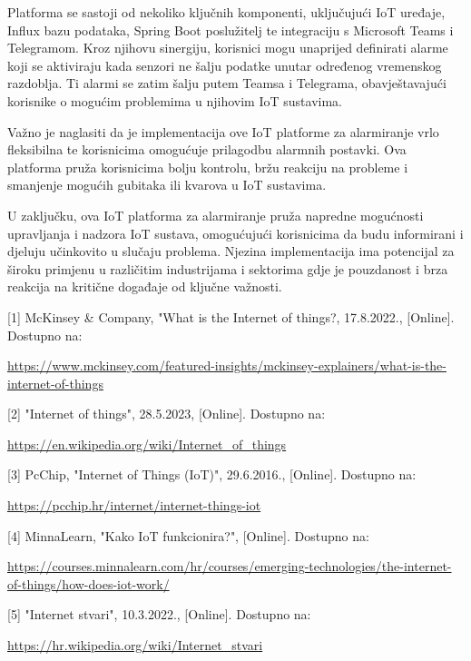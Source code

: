 \documentclass[times, utf8, zavrsni]{fer}
\begin{document}
Platforma se sastoji od nekoliko ključnih komponenti, uključujući IoT uređaje, Influx bazu podataka, Spring Boot poslužitelj te integraciju s Microsoft Teams i Telegramom. Kroz njihovu sinergiju, korisnici mogu unaprijed definirati alarme koji se aktiviraju kada senzori ne šalju podatke unutar određenog vremenskog razdoblja. Ti alarmi se zatim šalju putem Teamsa i Telegrama, obavještavajući korisnike o mogućim problemima u njihovim IoT sustavima.

Važno je naglasiti da je implementacija ove IoT platforme za alarmiranje vrlo fleksibilna te korisnicima omogućuje prilagodbu alarmnih postavki. Ova platforma pruža korisnicima bolju kontrolu, bržu reakciju na probleme i smanjenje mogućih gubitaka ili kvarova u IoT sustavima.

U zaključku, ova IoT platforma za alarmiranje pruža napredne mogućnosti upravljanja i nadzora IoT sustava, omogućujući korisnicima da budu informirani i djeluju učinkovito u slučaju problema. Njezina implementacija ima potencijal za široku primjenu u različitim industrijama i sektorima gdje je pouzdanost i brza reakcija na kritične događaje od ključne važnosti.

 
[1] McKinsey \& Company, "What is the Internet of things?, 17.8.2022., [Online]. 
Dostupno na: 

\href{https://www.mckinsey.com/featured-insights/mckinsey-explainers/what-is-the-internet-of-things}
{https://www.mckinsey.com/featured-insights/mckinsey-explainers/what-is-the-internet-of-things}

[2] "Internet of things", 28.5.2023, [Online].
Dostupno na:

\href{https://en.wikipedia.org/wiki/Internet_of_things}{https://en.wikipedia.org/wiki/Internet_of_things}

[3] PcChip, "Internet of Things (IoT)", 29.6.2016., [Online].
Dostupno na:

\href{ https://pcchip.hr/internet/internet-things-iot/}
{https://pcchip.hr/internet/internet-things-iot}

[4] MinnaLearn, "Kako IoT funkcionira?", [Online].
Dostupno na:

 \href{https://courses.minnalearn.com/hr/courses/emerging-technologies/the-internet-of-things/how-does-iot-work/}
 {https://courses.minnalearn.com/hr/courses/emerging-technologies/the-internet-of-things/how-does-iot-work/}

[5] "Internet stvari", 10.3.2022., [Online].
Dostupno na:

 \href{https://hr.wikipedia.org/wiki/Internet_stvari}{https://hr.wikipedia.org/wiki/Internet_stvari}
\end{document}
